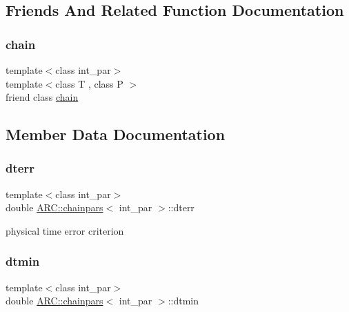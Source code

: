 \subsection{Friends And Related Function Documentation}
\hypertarget{classARC_1_1chainpars_a569feb0e3508338e81284973f08c5750}{}\label{classARC_1_1chainpars_a569feb0e3508338e81284973f08c5750} 
\subsubsection{\texorpdfstring{chain}{chain}}
{\footnotesize\ttfamily template$<$class int\+\_\+par$>$ \\
template$<$class T , class P $>$ \\
friend class \hyperlink{classARC_1_1chain}{chain}\hspace{0.3cm}{\ttfamily [friend]}}



\subsection{Member Data Documentation}
\hypertarget{classARC_1_1chainpars_a6824d23b1d73f10512d851219fedf744}{}\label{classARC_1_1chainpars_a6824d23b1d73f10512d851219fedf744} 
\subsubsection{\texorpdfstring{dterr}{dterr}}
{\footnotesize\ttfamily template$<$class int\+\_\+par$>$ \\
double \hyperlink{classARC_1_1chainpars}{A\+R\+C\+::chainpars}$<$ int\+\_\+par $>$\+::dterr}



physical time error criterion 

\hypertarget{classARC_1_1chainpars_a11a8ecf973a455e4b90ad6cdda49b3e0}{}\label{classARC_1_1chainpars_a11a8ecf973a455e4b90ad6cdda49b3e0} 
\subsubsection{\texorpdfstring{dtmin}{dtmin}}
{\footnotesize\ttfamily template$<$class int\+\_\+par$>$ \\
double \hyperlink{classARC_1_1chainpars}{A\+R\+C\+::chainpars}$<$ int\+\_\+par $>$\+::dtmin}



